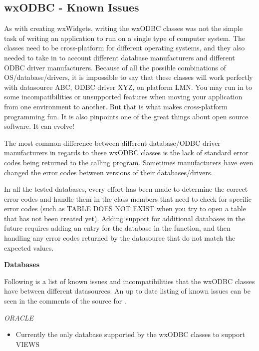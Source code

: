 
\subsection{wxODBC - Known Issues}\label{wxodbcknownissues}

As with creating wxWidgets, writing the wxODBC classes was not the simple 
task of writing an application to run on a single type of computer system. 
The classes need to be cross-platform for different operating systems, and 
they also needed to take in to account different database manufacturers and 
different ODBC driver manufacturers. Because of all the possible combinations 
of OS/database/drivers, it is impossible to say that these classes will work 
perfectly with datasource ABC, ODBC driver XYZ, on platform LMN. You may run 
in to some incompatibilities or unsupported features when moving your 
application from one environment to another. But that is what makes 
cross-platform programming fun. It is also pinpoints one of the great 
things about open source software. It can evolve!

The most common difference between different database/ODBC driver 
manufacturers in regards to these wxODBC classes is the lack of 
standard error codes being returned to the calling program. Sometimes 
manufacturers have even changed the error codes between versions of 
their databases/drivers. 

In all the tested databases, every effort has been made to determine 
the correct error codes and handle them in the class members that need 
to check for specific error codes (such as TABLE DOES NOT EXIST when 
you try to open a table that has not been created yet). Adding support 
for additional databases in the future requires adding an entry for the 
database in the  function, and then handling any error codes 
returned by the datasource that do not match the expected values.

{\bf Databases}

Following is a list of known issues and incompatibilities that the 
wxODBC classes have between different datasources. An up to date 
listing of known issues can be seen in the comments of the source 
for .

{\it ORACLE}
\begin{itemize}\itemsep=0pt
\item Currently the only database supported by the wxODBC classes to support VIEWS
\end{itemize}

